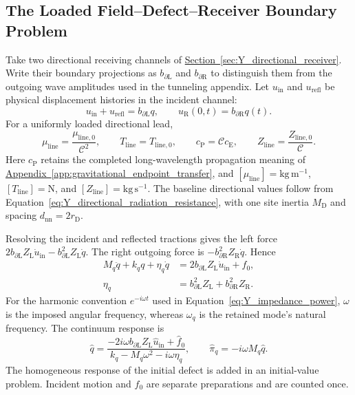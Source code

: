 \subsection{The Loaded Field--Defect--Receiver Boundary Problem}

Take two directional receiving channels of \hyperref[sec:Y_directional_receiver]{Section~\ref*{sec:Y_directional_receiver}}. Write their boundary projections as $b_{\partial\mathrm L}$ and $b_{\partial\mathrm R}$ to distinguish them from the outgoing wave amplitudes used in the tunneling appendix. Let $u_{\mathrm{in}}$ and $u_{\mathrm{refl}}$ be physical displacement histories in the incident channel:
\begin{equation}
 u_{\mathrm{in}}+u_{\mathrm{refl}}=b_{\partial\mathrm L}q,
 \qquad
 u_{\mathrm R}(0,t)=b_{\partial\mathrm R}q(t).
\label{eq:DMR_boundary_matching}
\end{equation}
For a uniformly loaded directional lead,
\begin{equation}
 \mu_{\mathrm{line}}=\frac{\mu_{\mathrm{line},0}}{\mathcal C^2},
 \qquad T_{\mathrm{line}}=T_{\mathrm{line},0},
 \qquad c_{\mathrm P}=\mathcal C c_{\mathrm E},
 \qquad Z_{\mathrm{line}}=\frac{Z_{\mathrm{line},0}}{\mathcal C}.
\label{eq:DMR_loaded_lead}
\end{equation}
Here $c_{\mathrm P}$ retains the completed long-wavelength propagation meaning of \hyperref[app:gravitational_endpoint_transfer]{Appendix~\ref*{app:gravitational_endpoint_transfer}}, and $[\mu_{\mathrm{line}}]=\mathrm{kg\,m^{-1}}$, $[T_{\mathrm{line}}]=\mathrm N$, and $[Z_{\mathrm{line}}]=\mathrm{kg\,s^{-1}}$. The baseline directional values follow from Equation~\eqref{eq:Y_directional_radiation_resistance}, with one site inertia $M_{\mathrm D}$ and spacing $d_{\mathrm{nn}}=2r_{\mathrm D}$.

Resolving the incident and reflected tractions gives the left force $2b_{\partial\mathrm L}Z_{\mathrm L}\dot u_{\mathrm{in}}-b_{\partial\mathrm L}^2Z_{\mathrm L}\dot q$. The right outgoing force is $-b_{\partial\mathrm R}^2Z_{\mathrm R}\dot q$. Hence
\begin{align}
 M_q\ddot q+k_qq+\eta_q\dot q
 &=2b_{\partial\mathrm L}Z_{\mathrm L}\dot u_{\mathrm{in}}+f_0,
 \label{eq:DMR_two_sided_motion}\\
 \eta_q&=b_{\partial\mathrm L}^2Z_{\mathrm L}
 +b_{\partial\mathrm R}^2Z_{\mathrm R}.
 \label{eq:DMR_two_sided_resistance}
\end{align}
For the harmonic convention $e^{-i\omega t}$ used in Equation~\eqref{eq:Y_impedance_power}, $\omega$ is the imposed angular frequency, whereas $\omega_q$ is the retained mode's natural frequency. The continuum response is
\begin{equation}
 \widehat q=
 \frac{-2i\omega b_{\partial\mathrm L}Z_{\mathrm L}\widehat u_{\mathrm{in}}
 +\widehat f_0}
 {k_q-M_q\omega^2-i\omega\eta_q},
 \qquad \widehat\pi_q=-i\omega M_q\widehat q.
\label{eq:DMR_loaded_response}
\end{equation}
The homogeneous response of the initial defect is added in an initial-value problem. Incident motion and $f_0$ are separate preparations and are counted once.

